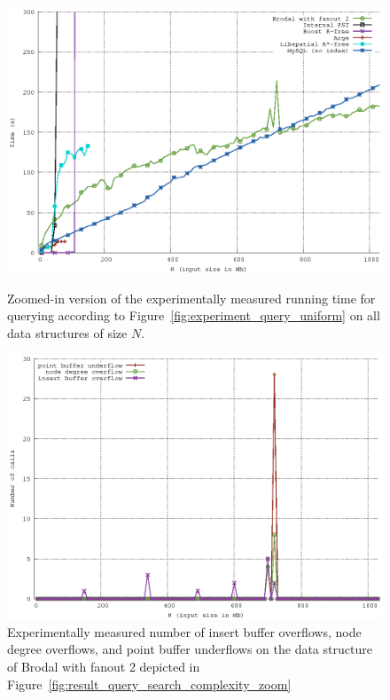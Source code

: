 \documentclass[twoside,11pt,openright]{report}
\begin{document}
\begin{figure}[H]
\centering
\includegraphics[width=\textwidth]{../src/experiments/query_experiment_results/final2/time_zoom}
\caption{Zoomed-in version of the experimentally measured running time for querying according to Figure~\ref{fig:experiment_query_uniform} on all data structures of size $N$.}
\label{fig:result_query_search_complexity_zoom}
\includegraphics[width=\textwidth]{../src/experiments/query_experiment_results/final2/all_operations}
\caption{Experimentally measured number of insert buffer overflows, node degree overflows, and point buffer underflows on the data structure of Brodal with fanout 2 depicted in Figure~\ref{fig:result_query_search_complexity_zoom}}
\label{fig:result_query_search_fixup}
\end{figure}
\end{document}

